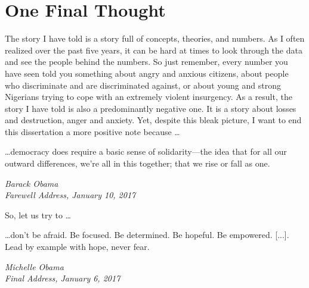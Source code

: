 \newpage
\section{One Final Thought}
\label{sec:64}
The story I have told is a story full of concepts, theories, and numbers. As I often realized over the past five years, it can be hard at times to look through the data and see the people behind the numbers. So just remember, every number you have seen told you something about angry and anxious citizens, about people who discriminate and are discriminated against, or about young and strong Nigerians trying to cope with an extremely violent insurgency. As a result, the story I have told is also a predominantly negative one. It is a story about losses and destruction, anger and anxiety. Yet, despite this bleak picture, I want to end this dissertation a more positive note because \dots

\vspace{0.5cm}

\epigraph{ \dots democracy does require a basic sense of solidarity---the idea that for all our outward differences, we're all in this together; that we rise or fall as one.}{\textit{Barack Obama \\ Farewell Address, January 10, 2017}}

So, let us try to \dots

\epigraph{ \dots don't be afraid. Be focused. Be determined. Be hopeful. Be empowered. [...]. Lead by example with hope, never fear.}{\textit{Michelle Obama \\ Final Address, January 6, 2017}}


\clearpage



